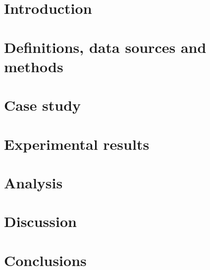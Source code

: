 \minitoc

\section{Introduction}
\label{sec:testability:intro}


\section{Definitions, data sources and methods}
\label{sec:testability:methodology}


\section{Case study}
\label{sec:testability:case-study}


\section{Experimental results}
\label{sec:testability:results}


\section{Analysis}
\label{sec:testability:analysis}


\section{Discussion}
\label{sec:testability:discussion}


\section{Conclusions}
\label{sec:testability:conclusions}
